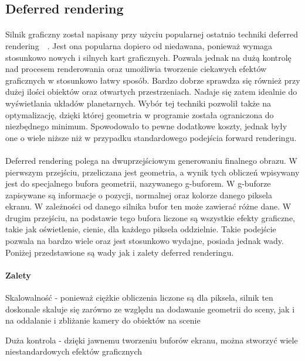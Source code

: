 \subsection{Deferred rendering}\label{sub:deferred rendering}
\paragraph{}

Silnik graficzny został napisany przy użyciu popularnej ostatnio techniki deferred rendering~\cite{gpugems:deferred}~\cite{calver:deferred}. Jest ona popularna dopiero od niedawana, ponieważ wymaga stosunkowo nowych i silnych kart graficznych. Pozwala jednak na dużą kontrolę nad procesem renderowania oraz umożliwia tworzenie ciekawych efektów graficznych w stosunkowo łatwy sposób. Bardzo dobrze sprawdza się również przy dużej ilości obiektów oraz otwartych przestrzeniach. Nadaje się zatem idealnie do wyświetlania układów planetarnych. Wybór tej techniki pozwolił także na optymalizację, dzięki której geometria w programie została ograniczona do niezbędnego minimum. Spowodowało to pewne dodatkowe koszty, jednak były one o wiele niższe niż w przypadku standardowego podejścia forward renderingu.

\paragraph{}

Deferred rendering polega na dwuprzejściowym generowaniu finalnego obrazu. W pierwszym przejściu, przeliczana jest geometria, a wynik tych obliczeń wpisywany jest do specjalnego bufora geometrii, nazywanego g-buforem. W g-buforze zapisywane są informacje o pozycji, normalnej oraz kolorze danego piksela ekranu. W zależności od danego silnika bufor ten może zawierać różne dane. W drugim przejściu, na podstawie tego bufora liczone są wszystkie efekty graficzne, takie jak oświetlenie, cienie, dla każdego piksela oddzielnie. Takie podejście pozwala na bardzo wiele oraz jest stosunkowo wydajne, posiada jednak wady. Poniżej przedstawione są wady jak i zalety deferred renderingu.

\paragraph{Zalety}

\begin{description}
\item{Skalowalność} - ponieważ ciężkie obliczenia liczone są dla piksela, silnik ten doskonale skaluje się zarówno ze względu na dodawanie geometrii do sceny, jak i na oddalanie i zbliżanie kamery do obiektów na scenie

\item{Duża kontrola} - dzięki jawnemu tworzeniu buforów ekranu, można stworzyć wiele niestandardowych efektów graficznych

\end{description}

